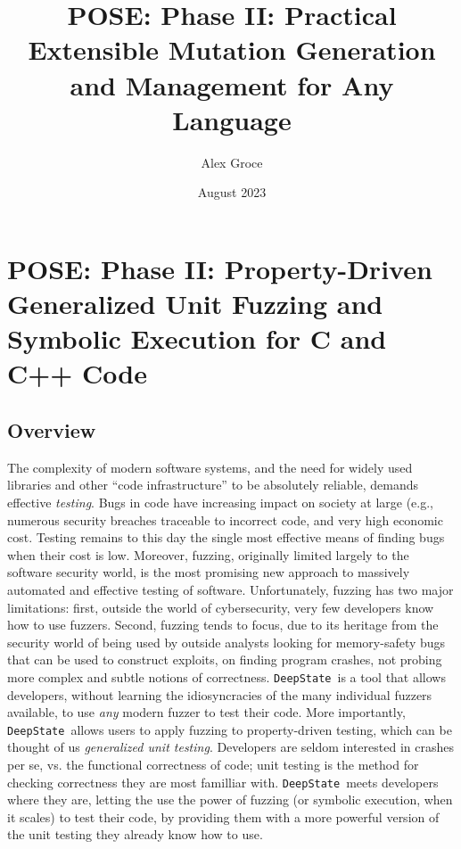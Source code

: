\documentclass[numbers]{proposalnsf}
\title{POSE: Phase II: Practical Extensible Mutation Generation and Management for Any Language}
\author{Alex Groce }
\date{August 2023}
\newcommand{\ds}{\texttt{DeepState}}
\begin{document}
\section*{POSE: Phase II: Property-Driven Generalized Unit Fuzzing and Symbolic Execution for C and C++ Code}

\subsection*{Overview}
\vspace{-2mm}


The complexity of modern software systems, and the need for widely used libraries and other ``code infrastructure'' to be absolutely reliable, demands effective \emph{testing}.  Bugs in code have increasing impact on society at large (e.g., numerous security breaches traceable to incorrect code, and very high economic cost.  Testing remains to this day the single most effective means of finding bugs when their cost is low.   Moreover, fuzzing, originally limited largely to the software security world, is the most promising new approach to massively automated and effective testing of software.  Unfortunately, fuzzing has two major limitations: first, outside the world of cybersecurity, very few developers know how to use fuzzers.  Second, fuzzing tends to focus, due to its heritage from the security world of being used by outside analysts looking for memory-safety bugs that can be used to construct exploits, on finding program crashes, not probing more complex and subtle notions of correctness.  \ds\ is a tool that allows developers, without learning the idiosyncracies of the many individual fuzzers available, to use \emph{any} modern fuzzer to test their code.  More importantly, \ds\ allows users to apply fuzzing to property-driven testing, which can be thought of us \emph{generalized unit testing}.  Developers are seldom interested in crashes per se, vs. the functional correctness of code; unit testing is the method for checking correctness they are most familliar with.  \ds\ meets developers where they are, letting the use the power of fuzzing (or symbolic execution, when it scales) to test their code, by providing them with a more powerful version of the unit testing they already know how to use.
\end{document}
